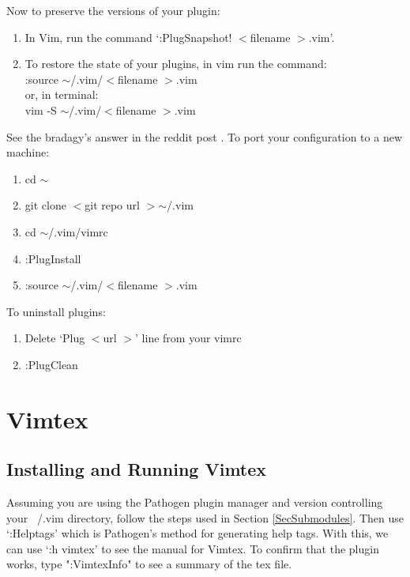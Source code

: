 \documentclass[10pt]{article}
\newcommand{\tsim}{$\sim$}
\newcommand{\tlangle}{$<$}
\newcommand{\trangle}{$>$}
\begin{document}
Now to preserve the versions of your plugin:
\begin{enumerate}
    \item In Vim, run the command `:PlugSnapshot! \tlangle filename \trangle.vim'.
    \item To restore the state of your plugins, in vim run the command:\\
        :source \tsim/.vim/\tlangle filename \trangle.vim\\
        or, in terminal:\\
        vim -S \tsim/.vim/\tlangle filename \trangle.vim
\end{enumerate}
See the bradagy's answer in the reddit post \cite{bradagy2018remember}. To port your configuration to a new
machine:
\begin{enumerate}
    \item cd \tsim
    \item git clone \tlangle git repo url \trangle \tsim/.vim
    \item cd \tsim/.vim/vimrc
    \item :PlugInstall
    \item :source \tsim/.vim/\tlangle filename \trangle.vim
\end{enumerate}
To uninstall plugins:
\begin{enumerate}
    \item Delete `Plug \tlangle url \trangle' line from your vimrc
    \item :PlugClean
\end{enumerate}


\section{Vimtex}
\subsection{Installing and Running Vimtex}
Assuming you are using the Pathogen plugin manager and version controlling your ~/.vim directory, follow the steps used
in Section \ref{SecSubmodules}. Then use `:Helptags' which is Pathogen's method for generating help tags. With this, we
can use `:h vimtex' to see the manual for Vimtex. To confirm that the plugin works, type ":VimtexInfo" to see a summary
of the tex file.
\end{document}
